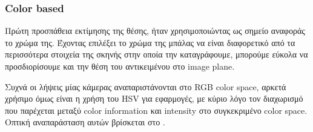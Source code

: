 \subsubsection{Color based}

Πρώτη προσπάθεια εκτίμησης της θέσης, ήταν χρησιμοποιώντας ως σημείο αναφοράς το χρώμα της. Έχοντας επιλέξει το χρώμα της μπάλας να είναι διαφορετικό από τα περισσότερα στοιχεία της σκηνής στην οποία την καταγράφουμε, μπορούμε εύκολα να προσδιορίσουμε και την θέση του αντικειμένου στο image plane.

Συχνά οι λήψεις μίας κάμερας αναπαριστάνονται στο RGB color space, αρκετά χρήσιμο όμως είναι η χρήση του HSV για  εφαρμογές, με κύριο λόγο τον διαχωρισμό που παρέχεται μεταξύ color information και intensity στο συγκεκριμένο color space. Οπτική αναπαράσταση αυτών βρίσκεται στο . 

